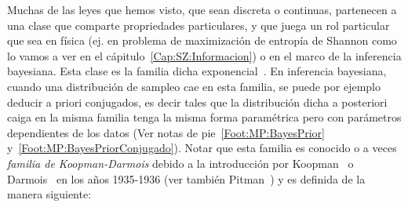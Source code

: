 \label{Ssec:MP:FamiliaExponencial}




Muchas de las leyes que hemos visto, que sean discreta o continuas, partenecen a
una clase que comparte propriedades  particulares, y que juega un rol particular
que sea en f\'isica (ej. en  problema de maximizaci\'on de entrop\'ia de Shannon
como lo vamos a ver en  el c\'apitulo~\ref{Cap:SZ:Informacion}) o en el marco de
la inferencia bayesiana. Esta clase es la familia dicha exponencial~\cite{Dar35,
  Koo36, And70, LehCas98, IbPer12,  Muk00, KotBal00, Rob07, Bos07, Cen82, Kay93,
  NieNoc10}.  En inferencia bayesiana,  cuando una distribuci\'on de sampleo cae
en esta  familia, se  puede por  ejemplo deducir a  priori conjugados,  es decir
tales que  la distribuci\'on dicha  a posteriori caiga  en la misma  familia \ie
tenga la  misma forma  param\'etrica pero con  par\'ametros dependientes  de los
datos         (Ver         notas         de         pie~\ref{Foot:MP:BayesPrior}
y~\ref{Foot:MP:BayesPriorConjugado}).
Notar que esta familia  es conocido o a
veces  {\em   familia  de  Koopman-Darmois}  debido  a   la  introducci\'on  por
Koopman~\cite{Koo36}  o  Darmois~\cite{Dar35}   en  los  a\~nos  1935-1936  (ver
tambi\'en Pitman~\cite{Pit36}) y es definida de la manera siguiente:
%
